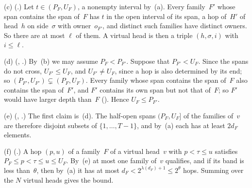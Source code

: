 \begin{outline}
(c) (.) Let $t\in(P_F,U_F)$, a nonempty interval by~(a). Every family~$F'$ whose span contains the span of~$F$ has $t$ in the
open interval of its span, a hop of~$H'$ of head~$h$ on side~$\sigma$ with owner~$o_{F'}$, and distinct such families have
distinct owners. So there are at most $\ell$ of them. A virtual head is then a triple $(h,\sigma,i)$ with $i\le\ell$.

(d) (, .) By~(b) we may assume $P_F<P_{F'}$. Suppose that $P_{F'}<U_F$. Since the spans do
not cross, $U_{F'}\le U_F$, and $U_{F'}\ne U_F$, since a hop is also determined by its end; so
$(P_{F'},U_{F'})\subsetneq(P_F,U_F)$. Every family whose span contains the span of~$F$ also contains the span of~$F'$, and
$F'$ contains its own span but not that of~$F$; so $F'$ would have larger depth than~$F$ (). Hence
$U_F\le P_{F'}$.

(e) (, .) The first claim is~(d). The half-open spans $(P_F,U_F]$ of the families of~$v$ are therefore disjoint subsets of
$\{1,\dots,T-1\}$, and by~(a) each has at least $2d_F$ elements.

(f) (.) A hop $(p,u)$ of a family~$F$ of a virtual head~$v$ with $p<\tau\le u$ satisfies $P_F\le p<\tau\le u\le U_F$. By~(e)
at most one family of~$v$ qualifies, and if its band is less than~$\theta$, then by~(a) it has at most
$d_F<2^{\lambda(d_F)+1}\le2^\theta$ hops. Summing over the $N$ virtual heads gives the bound.
\end{outline}

